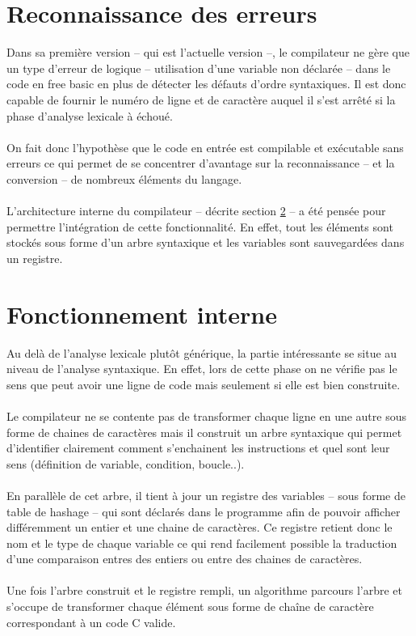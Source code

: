 \documentclass{article}
\begin{document}
\section{Reconnaissance des erreurs}
Dans sa première version -- qui est l'actuelle version --, le compilateur ne gère que un type 
d'erreur de logique -- utilisation d'une variable non déclarée -- dans le code 
en free basic en plus de détecter les défauts d'ordre syntaxiques. Il est donc capable 
de fournir le numéro de ligne et de caractère auquel il s'est arrêté si la phase
d'analyse lexicale à échoué.
\\\\
On fait donc l'hypothèse que le code en entrée est compilable et exécutable sans erreurs
ce qui permet de se concentrer d'avantage sur la reconnaissance -- et la conversion -- 
de nombreux éléments du langage.
\\\\
L'architecture interne du compilateur -- décrite section \ref{sec:Fonctionnement} -- a été pensée pour permettre
l'intégration de cette fonctionnalité. En effet, tout les éléments sont stockés sous forme
d'un arbre syntaxique et les variables sont sauvegardées dans un registre.
	
\section{Fonctionnement interne}\label{sec:Fonctionnement}
Au delà de l'analyse lexicale plutôt générique, la partie intéressante se situe au niveau
de l'analyse syntaxique. En effet, lors de cette phase on ne vérifie pas le sens que peut avoir 
une ligne de code mais 
seulement si elle est bien construite. 
\\\\
Le compilateur ne se contente pas de transformer 
chaque ligne en une autre sous forme de chaines de caractères mais il construit un 
arbre syntaxique qui permet d'identifier clairement comment s'enchainent les instructions
et quel sont leur sens (définition de variable, condition, boucle..).
\\\\
En parallèle de cet arbre, il tient à jour un registre des variables -- sous forme de 
table de hashage -- qui sont déclarés dans le programme afin de pouvoir afficher 
différemment un entier et une chaine de caractères. Ce registre retient donc le nom et le
type de chaque variable ce qui rend facilement possible la traduction d'une comparaison 
entres des entiers ou entre des chaines de caractères.
\\\\
Une fois l'arbre construit et le registre rempli, un algorithme parcours l'arbre et 
s'occupe de transformer chaque élément sous forme de chaîne de caractère correspondant
à un code C valide.
\end{document}
